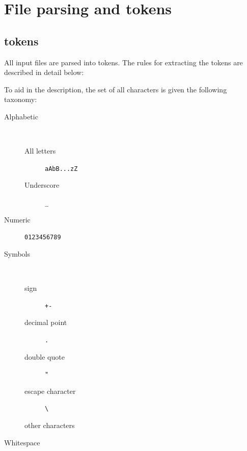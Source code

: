 \documentclass{article}
\begin{document}

\section{File parsing and tokens}

\subsection{tokens}

All input files are parsed into tokens. The rules for extracting the tokens are described in detail below:

To aid in the description, the set of all characters is given the following taxonomy:

\begin{description}
\item[Alphabetic] ~
	\begin{description} 
	\item[All letters] \texttt{aAbB...zZ}
	\item[Underscore] \texttt{\_}
	\end{description}
\item[Numeric] \texttt{0123456789}
\item[Symbols] ~
	\begin{description}
	\item[sign] \texttt{+-}
	\item[decimal point] \texttt{.}
	\item[double quote] \texttt{"}
	\item[escape character] \texttt{\textbackslash}
	\item[other characters]
	\end{description}
\item[Whitespace] 
\end{description}

\vspace{5mm}
\end{document}
